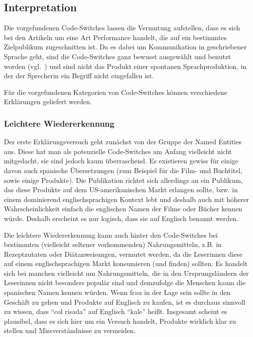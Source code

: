 \subsection{Interpretation}
\label{chap:results-analysis}

Die vorgefundenen Code-Switches lassen die Vermutung aufstellen, dass es sich bei den Artikeln um eine Art Performance handelt, die auf ein bestimmtes Zielpublikum zugeschnitten ist.
Da es dabei um Kommunikation in geschriebener Sprache geht, sind die Code-Switches ganz bewusst ausgewählt und benutzt worden (vgl.~\cite{Mahootian05}) und sind nicht das Produkt einer spontanen Sprachproduktion, in der der Sprecherin ein Begriff nicht eingefallen ist.

Für die vorgefundenen Kategorien von Code-Switches können verschiedene Erklärungen geliefert werden.

\subsubsection{Leichtere Wiedererkennung}
Der erste Erklärungsversuch geht zunächst von der Gruppe der Named Entities aus.
Diese hat man als potenzielle Code-Switches am Anfang vielleicht nicht mitgedacht, sie sind jedoch kaum überraschend.
Es existieren gewiss für einige davon auch spanische Übersetzungen (zum Beispiel für die Film- und Buchtitel, sowie einige Produkte).
Die Publikation richtet sich allerdings an ein Publikum, das diese Produkte auf dem US-amerikanischen Markt erlangen sollte, bzw. in einem dominierend englischsprachigen Kontext lebt und deshalb auch mit höherer Wahrscheinlichkeit einfach die englischen Namen der Filme oder Bücher kennen würde.
Deshalb erscheint es nur logisch, dass sie auf Englisch benannt werden.

Die leichtere Wiedererkennung kann auch hinter den Code-Switches bei bestimmten (vielleicht seltener vorkommenden) Nahrungsmitteln, z.B. in Rezeptzutaten oder Diätanweisungen, vermutet werden, da die Leserinnen diese auf einem englischsprachigen Markt konsumieren (und finden) sollten.
Es handelt sich bei manchen vielleicht um Nahrungsmitteln, die in den Ursprungsländern der Leserinnen nicht besonders populär sind und demzufolge die Menschen kaum die spanischen Namen kennen würden.
Wenn frau in der Lage sein sollte in den Geschäft zu gehen und Produkte auf Englisch zu kaufen, ist es durchaus sinnvoll zu wissen, dass ``col risada'' auf Englisch ``kale'' heißt.
Insgesamt scheint es plausibel, dass es sich hier um ein Versuch handelt, Produkte wirklich klar zu stellen und Missverständnisse zu vermeiden.

